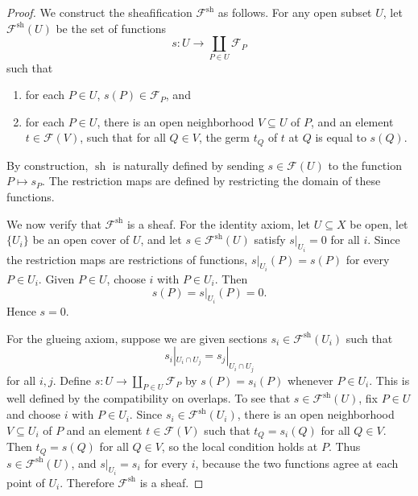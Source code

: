 \documentclass[11pt]{article}
\newcommand{\sh}{\operatorname{sh}}
\begin{document}
\begin{proof}
    We construct the sheafification \(\mathscr{F}^{\sh}\) as follows.
    For any open subset \(U\), let \(\mathscr{F}^{\sh}(U)\) be the set
    of functions
    \[
        s: U \longrightarrow \coprod_{P \in U} \mathscr{F}_{P}
    \]
    such that
    \begin{enumerate}[label = (\arabic*)]
        \item for each \(P \in U\), \(s(P) \in \mathscr{F}_{P}\), and
        \item for each \(P \in U\), there is an open neighborhood
        \(V \subseteq U\) of \(P\), and an element
        \(t \in \mathscr{F}(V)\), such that for all \(Q \in V\),
        the germ \(t_{Q}\) of \(t\) at \(Q\) is equal to \(s(Q)\).
    \end{enumerate}

    By construction, \(\sh\) is naturally defined by sending
    \(s \in \mathscr{F}(U)\) to the function \(P \mapsto s_{P}\).
    The restriction maps are defined by restricting the domain of
    these functions.

    We now verify that \(\mathscr{F}^{\sh}\) is a sheaf.
    For the identity axiom, let \(U \subseteq X\) be open, let
    \(\{U_{i}\}\) be an open cover of \(U\), and let
    \(s \in \mathscr{F}^{\sh}(U)\) satisfy
    \(s|_{U_{i}} = 0\) for all \(i\).
    Since the restriction maps are restrictions of functions,
    \(s|_{U_{i}}(P) = s(P)\) for every \(P \in U_{i}\).
    Given \(P \in U\), choose \(i\) with \(P \in U_{i}\).
    Then
    \[
        s(P) = s|_{U_{i}}(P) = 0.
    \]
    Hence \(s = 0\).

    For the glueing axiom, suppose we are given sections
    \(s_{i} \in \mathscr{F}^{\sh}(U_{i})\) such that
    \[
        s_{i}|_{U_{i} \cap U_{j}}
        =
        s_{j}|_{U_{i} \cap U_{j}}
    \]
    for all \(i,j\). Define
    \(s: U \to \coprod_{P \in U} \mathscr{F}_{P}\) by
    \(s(P) = s_{i}(P)\) whenever \(P \in U_{i}\).
    This is well defined by the compatibility on overlaps.
    To see that \(s \in \mathscr{F}^{\sh}(U)\), fix \(P \in U\)
    and choose \(i\) with \(P \in U_{i}\).
    Since \(s_{i} \in \mathscr{F}^{\sh}(U_{i})\), there is an open
    neighborhood \(V \subseteq U_{i}\) of \(P\) and an element
    \(t \in \mathscr{F}(V)\) such that
    \(t_{Q} = s_{i}(Q)\) for all \(Q \in V\).
    Then \(t_{Q} = s(Q)\) for all \(Q \in V\), so the local
    condition holds at \(P\). Thus \(s \in \mathscr{F}^{\sh}(U)\),
    and \(s|_{U_{i}} = s_{i}\) for every \(i\), because the two
    functions agree at each point of \(U_{i}\).
    Therefore \(\mathscr{F}^{\sh}\) is a sheaf.


\end{proof}
\end{document}
